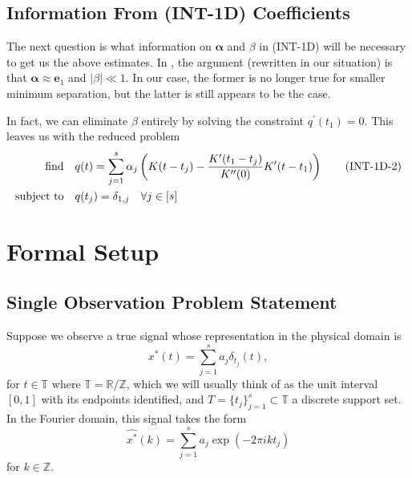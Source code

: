 \documentclass[11pt]{article}
\newcommand{\RR}{\mathbb{R}}
\newcommand{\TT}{\mathbb{T}}
\newcommand{\ZZ}{\mathbb{Z}}
\newcommand{\HS}{\hspace{3.5mm}}
\newcommand{\balpha}{\bm \alpha}
\newcommand{\be}{\bm e}
\begin{document}
\subsection{Information From (INT-1D) Coefficients}

The next question is what information on $\balpha$ and $\beta$ in (INT-1D) will be necessary to get us the above estimates.
In \cite{fernandez2016super}, the argument (rewritten in our situation) is that $\balpha \approx \be_1$ and $|\beta| \ll 1$.
In our case, the former is no longer true for smaller minimum separation, but the latter is still appears to be the case.

In fact, we can eliminate $\beta$ entirely by solving the constraint $q^\prime(t_1) = 0$.
This leaves us with the reduced problem
\begin{align*}
  \text{find} &\HS q(t) = \sum_{j = 1}^{s} \alpha_j \left(K(t - t_j) - \frac{K^{\prime}(t_1 - t_j)}{K^{\prime\prime}(0)}K^\prime(t - t_1)\right) \tag{\text{INT-1D-2}} \\
  \text{subject to}
              &\HS q(t_j) = \delta_{1,j} \HS \forall j \in [s]
\end{align*}

\clearpage

\section{Formal Setup}

\subsection{Single Observation Problem Statement}

Suppose we observe a true signal whose representation in the physical domain is
\begin{equation}
    x^*(t) = \sum_{j = 1}^s a_j \delta_{t_j}(t),
\end{equation}
for $t \in \TT$ where $\TT = \RR / \ZZ$, which we will usually think of as the unit interval $[0, 1]$ with its endpoints identified, and $T = \{t_j\}_{j = 1}^s \subset \TT$ a discrete support set.
In the Fourier domain, this signal takes the form
\begin{equation}
    \widehat{x^*}(k) = \sum_{j = 1}^s a_j \exp(-2\pi i k t_j)
\end{equation}
for $k \in \ZZ$.
\end{document}
